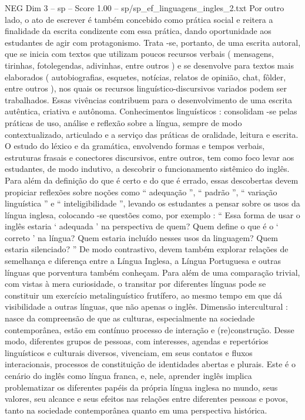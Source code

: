 \begin{textsample}{NEG Dim 3 – sp – Score 1.00 – sp/sp\_ef\_linguagens\_ingles\_2.txt}
Por outro lado, o ato de escrever é também concebido como prática social e reitera a finalidade da escrita condizente com essa prática, dando oportunidade aos estudantes de agir com protagonismo.
Trata -se, portanto, de uma escrita autoral, que se inicia com textos que utilizam poucos recursos verbais ( mensagens, tirinhas, fotolegendas, adivinhas, entre outros ) e se desenvolve para textos mais elaborados ( autobiografias, esquetes, notícias, relatos de opinião, chat, fôlder, entre outros ), nos quais os recursos linguístico-discursivos variados podem ser trabalhados.
Essas vivências contribuem para o desenvolvimento de uma escrita autêntica, criativa e autônoma.
Conhecimentos linguísticos : consolidam -se pelas práticas de uso, análise e reflexão sobre a língua, sempre de modo contextualizado, articulado e a serviço das práticas de oralidade, leitura e escrita.
O estudo do léxico e da gramática, envolvendo formas e tempos verbais, estruturas frasais e conectores discursivos, entre outros, tem como foco levar aos estudantes, de modo indutivo, a descobrir o funcionamento sistêmico do inglês.
Para além da definição do que é certo e do que é errado, essas descobertas devem propiciar reflexões sobre noções como “ adequação ”, “ padrão ”, “ variação linguística ” e “ inteligibilidade ”, levando os estudantes a pensar sobre os usos da língua inglesa, colocando -se questões como, por exemplo : “ Essa forma de usar o inglês estaria ‘ adequada ’ na perspectiva de quem?
Quem define o que é o ‘ correto ’ na língua?
Quem estaria incluído nesses usos da linguagem?
Quem estaria silenciado? ” De modo contrastivo, devem também explorar relações de semelhança e diferença entre a Língua Inglesa, a Língua Portuguesa e outras línguas que porventura também conheçam.
Para além de uma comparação trivial, com vistas à mera curiosidade, o transitar por diferentes línguas pode se constituir um exercício metalinguístico frutífero, ao mesmo tempo em que dá visibilidade a outras línguas, que não apenas o inglês.
Dimensão intercultural : nasce da compreensão de que as culturas, especialmente na sociedade contemporânea, estão em contínuo processo de interação e (re)construção.
Desse modo, diferentes grupos de pessoas, com interesses, agendas e repertórios linguísticos e culturais diversos, vivenciam, em seus contatos e fluxos interacionais, processos de constituição de identidades abertas e plurais.
Este é o cenário do inglês como língua franca, e, nele, aprender inglês implica problematizar os diferentes papéis da própria língua inglesa no mundo, seus valores, seu alcance e seus efeitos nas relações entre diferentes pessoas e povos, tanto na sociedade contemporânea quanto em uma perspectiva histórica.

\end{textsample}
